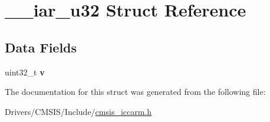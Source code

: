 \hypertarget{struct____iar__u32}{}\section{\+\_\+\+\_\+iar\+\_\+u32 Struct Reference}
\label{struct____iar__u32}
\subsection*{Data Fields}
\begin{DoxyCompactItemize}
\item 
\mbox{\label{struct____iar__u32_af8b16b2c629a3f2264c1af078ef2578a}} 
uint32\+\_\+t {\bfseries v}
\end{DoxyCompactItemize}


The documentation for this struct was generated from the following file\+:\begin{DoxyCompactItemize}
\item 
Drivers/\+C\+M\+S\+I\+S/\+Include/\hyperlink{cmsis__iccarm_8h}{cmsis\+\_\+iccarm.\+h}\end{DoxyCompactItemize}
